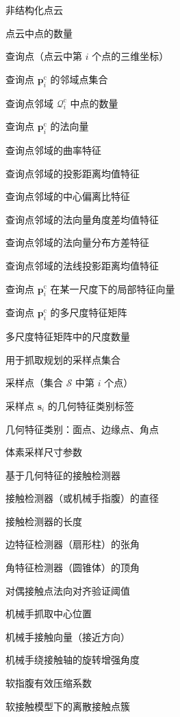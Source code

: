 \begin{denotation}[2.5cm]
\item[$\mathcal{P}^\text{c}$] 非结构化点云
\item[$n$] 点云中点的数量
\item[$\mathbf{p}_i^\text{c}$] 查询点（点云中第 $i$ 个点的三维坐标）
\item[$\mathcal{Q}_i^\text{c}$] 查询点 $\mathbf{p}_i^\text{c}$ 的邻域点集合
\item[$k$] 查询点邻域 $\mathcal{Q}_i^\text{c}$ 中点的数量
\item[$\mathbf{n}_i^\text{c}$] 查询点 $\mathbf{p}_i^\text{c}$ 的法向量
\item[$\kappa_i$] 查询点邻域的曲率特征
\item[$\bar{d}_i$] 查询点邻域的投影距离均值特征
\item[$r_i$] 查询点邻域的中心偏离比特征
\item[$\mu_{\theta,i}$] 查询点邻域的法向量角度差均值特征
\item[$\sigma^2_{\theta,i}$] 查询点邻域的法向量分布方差特征
\item[$\bar{\text{proj}_i}$] 查询点邻域的法线投影距离均值特征
\item[$\mathbf{x}_i^\text{c}$] 查询点 $\mathbf{p}_i^\text{c}$ 在某一尺度下的局部特征向量
\item[$\mathbf{X}_i^\text{c}$] 查询点 $\mathbf{p}_i^\text{c}$ 的多尺度特征矩阵
\item[$m$] 多尺度特征矩阵中的尺度数量
\item[$\mathcal{S}$] 用于抓取规划的采样点集合
\item[$\mathbf{s}_i$] 采样点（集合 $\mathcal{S}$ 中第 $i$ 个点）
\item[$f_i$] 采样点 $\mathbf{s}_i$ 的几何特征类别标签
\item[$\mathtt{f}, \mathtt{e}, \mathtt{c}$] 几何特征类别：面点、边缘点、角点
\item[$v$] 体素采样尺寸参数
\item[$\mathcal{D}_i$] 基于几何特征的接触检测器
\item[$d$] 接触检测器（或机械手指腹）的直径
\item[$l$] 接触检测器的长度
\item[$\theta_{\mathrm{sec}}$] 边特征检测器（扇形柱）的张角
\item[$\theta_{\mathrm{cone}}$] 角特征检测器（圆锥体）的顶角
\item[$\theta_{\mathrm{th}}$] 对偶接触点法向对齐验证阈值
\item[$\mathbf{j}_i$] 机械手抓取中心位置
\item[$\mathbf{v}_i$] 机械手接触向量（接近方向）
\item[$\beta$] 机械手绕接触轴的旋转增强角度
\item[$\eta$] 软指腹有效压缩系数
\item[$\mathbf{C}_i$] 软接触模型下的离散接触点簇
\end{denotation}
